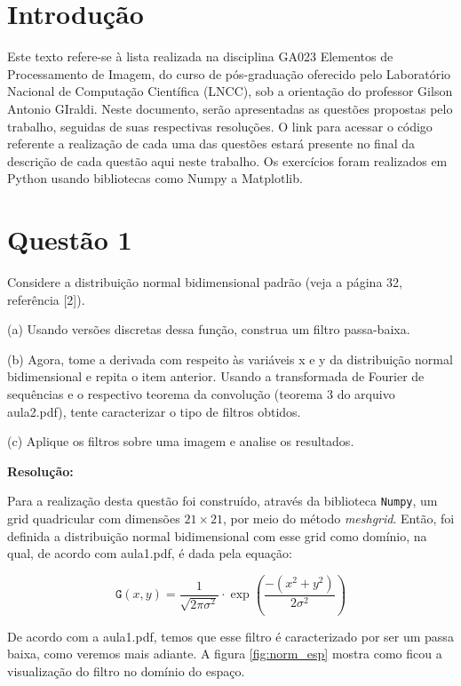 \documentclass[a4paper, 11pt]{article}
\begin{document}
\tableofcontents
\newpage

\section{\textbf{Introdução}}

Este texto refere-se à lista realizada na disciplina GA023 Elementos de Processamento de Imagem, do curso de pós-graduação oferecido pelo Laboratório Nacional de Computação Científica (LNCC), sob a orientação do professor Gilson Antonio GIraldi. Neste documento, serão apresentadas as questões propostas pelo trabalho, seguidas de suas respectivas resoluções. O link para acessar o código referente a realização de cada uma das questões estará presente no final da descrição de cada questão aqui neste trabalho. Os exercícios foram realizados em Python usando bibliotecas como Numpy a Matplotlib.

\section{\textbf{Questão 1}}
\noindent Considere a distribuição normal bidimensional padrão (veja a página 32, referência [2]). 

(a) Usando versões discretas dessa função, construa um filtro passa-baixa.

(b) Agora, tome a derivada com respeito às variáveis x e y da distribuição normal bidimensional e repita o item anterior. Usando a transformada de Fourier de sequências e o respectivo teorema da convolução (teorema 3 do arquivo aula2.pdf), tente caracterizar o tipo de filtros obtidos.

(c) Aplique os filtros sobre uma imagem e analise os resultados.

\textbf{Resolução:}

Para a realização desta questão foi construído, através da biblioteca \texttt{Numpy}, um grid quadricular com dimensões $21 \times 21$, por meio do método \textit{meshgrid}. Então, foi definida a distribuição normal bidimensional com esse grid como domínio, na qual, de acordo com aula1.pdf, é dada pela equação:

\begin{equation}
    \mathtt{G}(x,y) = \dfrac{1}{\sqrt{2  \pi  \sigma^2}} \cdot \exp \left(\dfrac{-(x^2+y^2)}{2 \sigma ^2}\right)
    \label{norm_eq}
\end{equation}

De acordo com a aula1.pdf, temos que esse filtro é caracterizado por ser um passa baixa, como veremos mais adiante. A figura \ref{fig:norm_esp} mostra como ficou a visualização do filtro no domínio do espaço.
\end{document}
